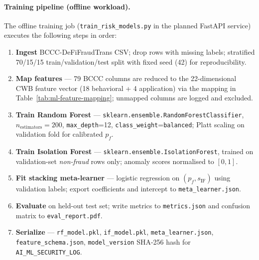 \documentclass[12pt,a4paper]{report}
\begin{document}
\paragraph{Training pipeline (offline workload).}
The offline training job (\texttt{train\_risk\_models.py} in the planned FastAPI service) executes the following steps in order:
\begin{enumerate}[noitemsep]
\item \textbf{Ingest} BCCC-DeFiFraudTrans CSV; drop rows with missing labels; stratified 70/15/15 train/validation/test split with fixed seed (42) for reproducibility.
\item \textbf{Map features} --- 79 BCCC columns are reduced to the 22-dimensional CWB feature vector (18 behavioral + 4 application) via the mapping in Table~\ref{tab:ml-feature-mapping}; unmapped columns are logged and excluded.
\item \textbf{Train Random Forest} --- \texttt{sklearn.ensemble.RandomForestClassifier}, $n_{\text{estimators}}{=}200$, \texttt{max\_depth}{=}12, \texttt{class\_weight}{=}\texttt{balanced}; Platt scaling on validation fold for calibrated $p_f$.
\item \textbf{Train Isolation Forest} --- \texttt{sklearn.ensemble.IsolationForest}, trained on validation-set \textit{non-fraud} rows only; anomaly scores normalised to $[0,1]$.
\item \textbf{Fit stacking meta-learner} --- logistic regression on $(p_f, s_{\text{IF}})$ using validation labels; export coefficients and intercept to \texttt{meta\_learner.json}.
\item \textbf{Evaluate} on held-out test set; write metrics to \texttt{metrics.json} and confusion matrix to \texttt{eval\_report.pdf}.
\item \textbf{Serialize} --- \texttt{rf\_model.pkl}, \texttt{if\_model.pkl}, \texttt{meta\_learner.json}, \texttt{feature\_schema.json}, \texttt{model\_version} SHA-256 hash for \texttt{AI\_ML\_SECURITY\_LOG}.
\end{enumerate}
\end{document}
